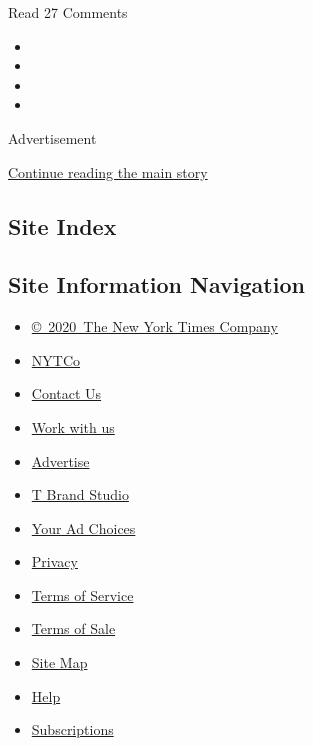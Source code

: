 Read 27 Comments

\begin{itemize}
\item
\item
\item
\item
\end{itemize}

Advertisement

\protect\hyperlink{after-bottom}{Continue reading the main story}

\hypertarget{site-index}{%
\subsection{Site Index}\label{site-index}}

\hypertarget{site-information-navigation}{%
\subsection{Site Information
Navigation}\label{site-information-navigation}}

\begin{itemize}
\tightlist
\item
  \href{https://help.nytimes.com/hc/en-us/articles/115014792127-Copyright-notice}{©~2020~The
  New York Times Company}
\end{itemize}

\begin{itemize}
\tightlist
\item
  \href{https://www.nytco.com/}{NYTCo}
\item
  \href{https://help.nytimes.com/hc/en-us/articles/115015385887-Contact-Us}{Contact
  Us}
\item
  \href{https://www.nytco.com/careers/}{Work with us}
\item
  \href{https://nytmediakit.com/}{Advertise}
\item
  \href{http://www.tbrandstudio.com/}{T Brand Studio}
\item
  \href{https://www.nytimes.com/privacy/cookie-policy\#how-do-i-manage-trackers}{Your
  Ad Choices}
\item
  \href{https://www.nytimes.com/privacy}{Privacy}
\item
  \href{https://help.nytimes.com/hc/en-us/articles/115014893428-Terms-of-service}{Terms
  of Service}
\item
  \href{https://help.nytimes.com/hc/en-us/articles/115014893968-Terms-of-sale}{Terms
  of Sale}
\item
  \href{https://spiderbites.nytimes.com}{Site Map}
\item
  \href{https://help.nytimes.com/hc/en-us}{Help}
\item
  \href{https://www.nytimes.com/subscription?campaignId=37WXW}{Subscriptions}
\end{itemize}
